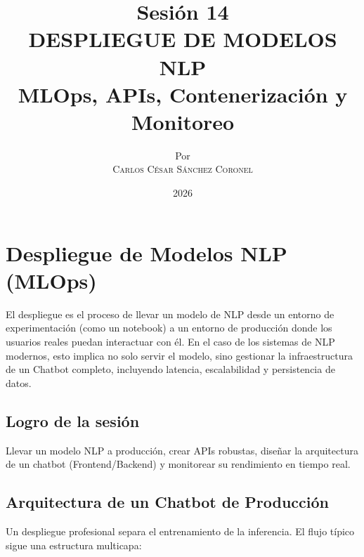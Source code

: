 \documentclass[12pt,a4paper,openany,oneside]{book}
\title{
    \textbf{Sesión 14} \\ 
    \Huge \textbf{DESPLIEGUE DE MODELOS NLP} \\
    \Large MLOps, APIs, Contenerización y Monitoreo
}
\author{
    \small Por \\ \vspace{0.2cm}
    \Large \textsc{Carlos César Sánchez Coronel}
}
\date{2026}
\begin{document}
\maketitle
\tableofcontents
{}

\chapter{Despliegue de Modelos NLP (MLOps)}

El despliegue es el proceso de llevar un modelo de NLP desde un entorno de experimentación (como un notebook) a un entorno de producción donde los usuarios reales puedan interactuar con él. En el caso de los sistemas de NLP modernos, esto implica no solo servir el modelo, sino gestionar la infraestructura de un Chatbot completo, incluyendo latencia, escalabilidad y persistencia de datos.

\section{Logro de la sesión}
Llevar un modelo NLP a producción, crear APIs robustas, diseñar la arquitectura de un chatbot (Frontend/Backend) y monitorear su rendimiento en tiempo real.

\section{Arquitectura de un Chatbot de Producción}

Un despliegue profesional separa el entrenamiento de la inferencia. El flujo típico sigue una estructura multicapa:
\end{document}
